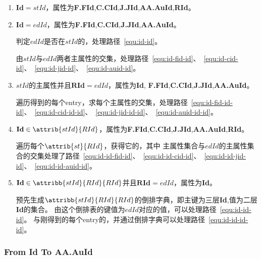 \documentclass[hyperref,UTF8]{ctexart}
\theoremstyle{definition}
\theoremstyle{remark}
\numberwithin{equation}{subsection}
\newcommand{\Emph}{\textbf}
\newcommand{\Evaluate}{\Emph{Evaluate}}
\newcommand{\Id}{\Emph{Id}}
\newcommand{\RId}{\Emph{RId}}
\newcommand{\FFId}{\Emph{F.FId}}
\newcommand{\CCId}{\Emph{C.CId}}
\newcommand{\JJId}{\Emph{J.JId}}
\newcommand{\AAAuId}{\Emph{AA.AuId}}
\begin{document}
	\begin{enumerate}[(1)]
	
		\item {}$\Emph{Id}=stId$，属性为\FFId,\CCId,\JJId,\AAAuId,\RId。
		
		\item {}$\Emph{Id}=edId$，属性为\FFId,\CCId,\JJId,\AAAuId。
		
		判定$edId$是否在$stId$的，处理路径~\ref{equ:id-id}。
		
		由$stId$与$edId$两者主属性的交集，处理路径~\ref{equ:id-fid-id}、~\ref{equ:id-cid-id}、~\ref{equ:id-jid-id}、~\ref{equ:id-auid-id}。
		
		\item {}$stId$的主属性并且$\Emph{RId}=edId$，属性为\Id, \FFId,\CCId,\JJId,\AAAuId。
		
		遍历得到的每个entry，求每个主属性的交集，处理路径~\ref{equ:id-fid-id-id}、~\ref{equ:id-cid-id-id}、~\ref{equ:id-jid-id-id}、~\ref{equ:id-auid-id-id}。
		
		\item {}$\Emph{Id} \in \attrib{stId}{RId}$，属性为\FFId,\CCId,\JJId,\AAAuId,\RId。
		
		遍历每个$\attrib{st}{RId}$，获得它的，其中
		主属性集合与$edId$的主属性集合的交集处理了路径~\ref{equ:id-id-fid-id}、~\ref{equ:id-id-cid-id}、~\ref{equ:id-id-jid-id}、~\ref{equ:id-id-auid-id}。
		
		\item {}$\Emph{Id} \in \attribb{stId}{RId}{RId}$并且$\Emph{RId}=edId$，属性为\Id。
		
		预先生成$\attribb{stId}{RId}{RId}$的倒排字典，即主键为三层\Emph{Id},值为二层\Emph{Id}的集合。
        由这个倒排表的键值为$edId$对应的值，可以处理路径~\ref{equ:id-id-id}。
		与刚得到的每个entry的，并通过倒排字典可以处理路径~\ref{equ:id-id-id-id}。
		
	\end{enumerate}

\subsubsection{From \Emph{Id} To \Emph{AA.AuId}}
\end{document}

